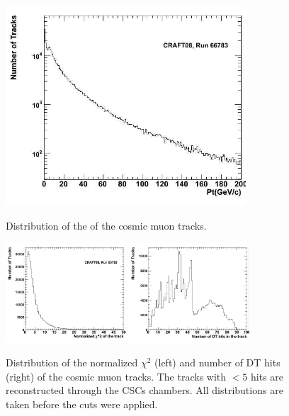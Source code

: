 \begin{figure}[hbtp]

     \begin{minipage}{1.0\textwidth}
     \begin{center}
      \includegraphics[width=0.8\textwidth]{pt_sta}
       \caption{ 
Distribution of the \pt of the cosmic muon tracks. 
}
      \label{fig:pttrack}
  \end{center}
  \end{minipage}
     
 \begin{minipage}{1.0\textwidth}
  \begin{center}
 
     \includegraphics[width=0.4\textwidth]{chi2_sta}
     \includegraphics[width=0.4\textwidth]{num_hits_sta}
\caption{Distribution of the normalized $\chi^2$ (left) and number of DT hits (right) 
of the cosmic muon tracks. The tracks with $< 5$ hits
are reconstructed through the CSCs chambers. 
All distributions are taken before the cuts were applied.
}
      \label{fig:nhitschi2}
  \end{center}
  \end{minipage}

\end{figure}

